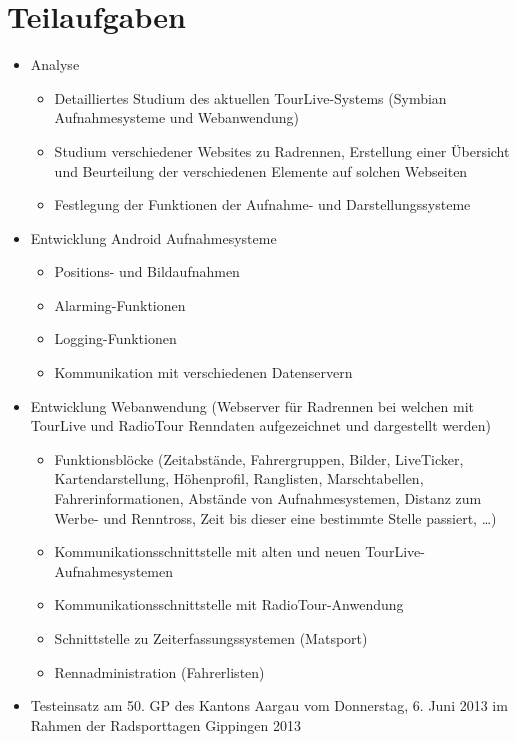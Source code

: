 \section*{Teilaufgaben}
\begin{itemize}
	\item Analyse
	\begin{itemize}
		\item Detailliertes Studium des aktuellen TourLive-Systems (Symbian Aufnahmesysteme und Webanwendung)
		\item Studium verschiedener Websites zu Radrennen, Erstellung einer Übersicht und Beurteilung der verschiedenen Elemente auf solchen Webseiten
		\item Festlegung der Funktionen der Aufnahme- und Darstellungssysteme
	\end{itemize}
	\item Entwicklung Android Aufnahmesysteme
	\begin{itemize}
		\item Positions- und Bildaufnahmen
		\item Alarming-Funktionen
		\item Logging-Funktionen
		\item Kommunikation mit verschiedenen Datenservern
	\end{itemize}
	\item Entwicklung Webanwendung (Webserver für Radrennen bei welchen mit TourLive und RadioTour Renndaten aufgezeichnet und dargestellt werden)
	\begin{itemize}
		\item Funktionsblöcke (Zeitabstände, Fahrergruppen, Bilder, LiveTicker, Kartendarstellung, Höhenprofil, Ranglisten, Marschtabellen, Fahrerinformationen, Abstände von Aufnahmesystemen, Distanz zum Werbe- und Renntross, Zeit bis dieser eine bestimmte Stelle passiert, …)
		\item Kommunikationsschnittstelle mit alten und neuen TourLive-Aufnahmesystemen
		\item Kommunikationsschnittstelle mit RadioTour-Anwendung
		\item Schnittstelle zu Zeiterfassungssystemen (Matsport)
		\item Rennadministration (Fahrerlisten)
	\end{itemize}
	\item Testeinsatz am 50. GP des Kantons Aargau vom Donnerstag, 6. Juni 2013 im Rahmen der Radsporttagen Gippingen 2013
\end{itemize}
